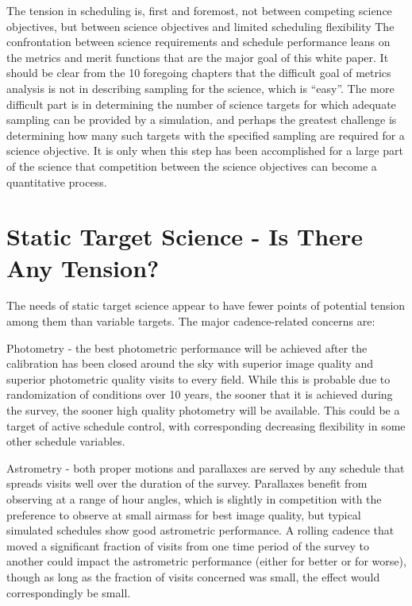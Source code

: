 The tension in scheduling is, first and foremost, not between competing science objectives, but between science objectives and limited scheduling flexibility The confrontation between science requirements and schedule performance leans on the metrics and merit functions that are the major goal of this white paper.  It should be clear from the 10 foregoing chapters that the difficult goal of metrics analysis is not in describing sampling for the science, which is ``easy''.  The more difficult part is in determining the number of science targets for which adequate sampling can be provided by a simulation, and perhaps the greatest challenge is determining how many such targets with the specified sampling are required for a science objective.  It is only when this step has been accomplished for a large part of the science that competition between the science objectives can become a quantitative process.


\section{Static Target Science - Is There Any Tension?}

The needs of static target science appear to have fewer points of potential tension among them than variable targets.  The major cadence-related concerns are:

Photometry - the best photometric performance will be achieved after the calibration has been closed around the sky with superior image quality and superior photometric quality visits to every field.  While this is probable due to randomization of conditions over 10 years, the sooner that it is achieved during the survey, the sooner high quality photometry will be available.  This could be a target of active schedule control, with corresponding decreasing flexibility in some other schedule variables.

Astrometry - both proper motions and parallaxes are served by any schedule that spreads visits well over the duration of the survey.  Parallaxes benefit from observing at a range of hour angles, which is slightly in competition with the preference to observe at small airmass for best image quality, but typical simulated schedules show good astrometric performance. A rolling cadence that moved a significant fraction of visits from one time period of the survey to another could impact the astrometric performance (either for better or for worse), though as long as the fraction of visits concerned was small, the effect would correspondingly be small.

